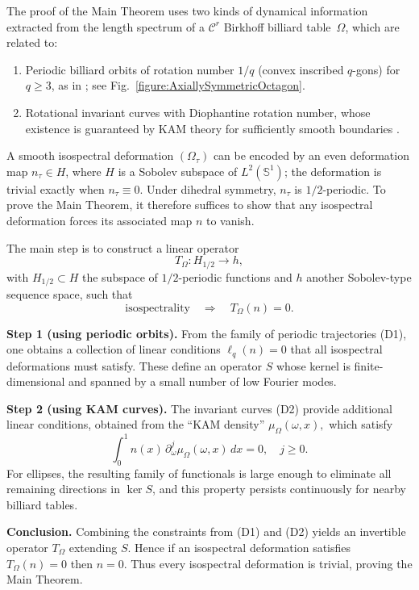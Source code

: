 \documentclass[12pt, openany]{amsart}
\theoremstyle{definition}
\theoremstyle{remark}
\theoremstyle{remark}
\theoremstyle{theorem}
\theoremstyle{theorem}
\theoremstyle{theorem}
\theoremstyle{theorem}
\begin{document}
The proof of the Main Theorem uses two kinds of dynamical information extracted from the length spectrum of a $\mathscr C^r$ Birkhoff billiard table~$\Omega$, which are related to:

\begin{enumerate}
\item[(D1)] Periodic billiard orbits of rotation number $1/q$ (convex inscribed $q$-gons) for $q\geq 3$, as in \cite{DKW}; see Fig.~\ref{figure:AxiallySymmetricOctagon}.
\item[(D2)] Rotational invariant curves with Diophantine rotation number, whose existence is guaranteed by KAM theory for sufficiently smooth boundaries \cite{Lazutkin}.
\end{enumerate}

A smooth isospectral deformation $(\Omega_\tau)$ can be encoded by an even deformation map $n_\tau\in H$, where $H$ is a Sobolev subspace of $L^2(\mathbb S^1)$; the deformation is trivial exactly when $n_\tau\equiv 0$. Under dihedral symmetry, $n_\tau$ is $1/2$-periodic. To prove the Main Theorem, it therefore suffices to show that any isospectral deformation forces its associated map $n$ to vanish.

The main step is to construct a linear operator
\[
T_\Omega : H_{1/2} \to h,
\]
with $H_{1/2}\subset H$ the subspace of $1/2$-periodic functions and $h$ another Sobolev-type sequence space, such that
\[
\text{isospectrality} \quad\Longrightarrow\quad T_\Omega(n)=0.
\]

\medskip

\noindent\textbf{Step 1 (using periodic orbits).}  
From the family of periodic trajectories (D1), one obtains a collection of linear conditions $\ell_q(n)=0$ that all isospectral deformations must satisfy. These define an operator $S$ whose kernel is finite-dimensional and spanned by a small number of low Fourier modes.

\medskip

\noindent\textbf{Step 2 (using KAM curves).}  
The invariant curves (D2) provide additional linear conditions, obtained from the ``KAM density''
$
\mu_\Omega(\omega,x),
$
which satisfy
\[
\int_0^1 n(x)\,\partial_\omega^j \mu_\Omega(\omega,x)\,dx=0,\quad j\geq 0.
\]
For ellipses, the resulting family of functionals is large enough to eliminate all remaining directions in $\ker S$, and this property persists continuously for nearby billiard tables.


\medskip

\noindent\textbf{Conclusion.} Combining the constraints from (D1) and (D2) yields an invertible operator $T_{\Omega}$ extending $S$. Hence if an isospectral deformation satisfies $T_\Omega(n)=0$ then $n=0$. Thus every isospectral deformation is trivial, proving the Main Theorem.
\end{document}
